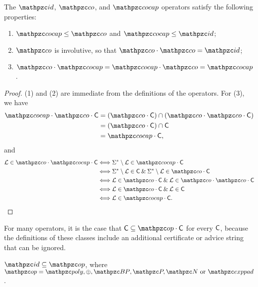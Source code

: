 \begin{proposition}
  The $\id$, $\cco$, and $\cocap$ operators satisfy the following properties:
  \begin{enumerate}
  \item $\cocap\leq\cco$ and $\cocap\leq\id$;
  \item $\cco$ is involutive, so that $\cco\cdot\cco=\id$;
  \item $\cco\cdot\cocap=\cocap\cdot\cco=\cocap$.
  \end{enumerate}
\end{proposition}

\begin{proof}
(1) and (2) are immediate from the definitions of the operators. For (3), we
have
\begin{align*}
\cocap\cdot\cco\cdot\sC&=(\cco\cdot\sC)\cap(\cco\cdot\cco\cdot\sC) \\
                      &=(\cco\cdot\sC)\cap\sC \\
                      &=\cocap\cdot\sC,
\end{align*}
and
\begin{align*}
\cL\in\cco\cdot\cocap\cdot\sC
&\Longleftrightarrow\Sigma^*\setminus\cL\in\cocap\cdot\sC \\
&\Longleftrightarrow\Sigma^*\setminus\cL\in\sC
\AND\Sigma^*\setminus\cL\in\cco\cdot\sC \\
&\Longleftrightarrow\cL\in\cco\cdot\sC\AND\cL\in\cco\cdot\cco\cdot\sC \\
&\Longleftrightarrow\cL\in\cco\cdot\sC\AND\cL\in\sC \\
&\Longleftrightarrow\cL\in\cocap\cdot\sC.
\end{align*}
\end{proof}

For many operators, it is the case that $\sC\subseteq\op\cdot\sC$ for every 
$\mathsf{C}$, because the definitions of these classes include an additional 
certificate or advice string that can be ignored.

\begin{proposition}
$\id\subseteq\op$, where $\op=\cpoly,\oplus,\cBP,\cP,\cN\text{ or }\exppad$.
\end{proposition}

